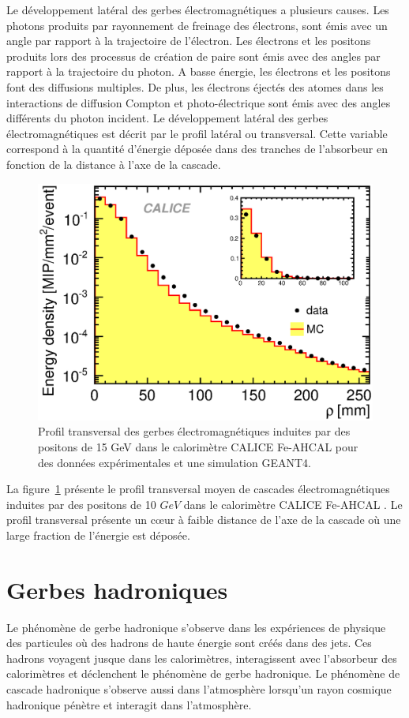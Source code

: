 Le développement latéral des gerbes électromagnétiques a plusieurs causes. Les photons produits par rayonnement de freinage des électrons, sont émis avec un angle par rapport à la trajectoire de l'électron. Les électrons et les positons produits lors des processus de création de paire sont émis avec des angles par rapport à la trajectoire du photon. A basse énergie, les électrons et les positons font des diffusions multiples. De plus, les électrons éjectés des atomes dans les interactions de diffusion Compton et photo-électrique sont émis avec des angles différents du photon incident. Le développement latéral des gerbes électromagnétiques est décrit par le profil latéral ou transversal. Cette variable correspond à la quantité d'énergie déposée dans des tranches de l'absorbeur en fonction de la distance à l'axe de la cascade. 

\begin{figure}[!h]
  \begin{center}
    \includegraphics[width=.5\textwidth]{ShowerTh/figs/transverseProfile_15gev_1cm.eps}
    \caption{Profil transversal des gerbes électromagnétiques induites par des positons de 15 GeV dans le calorimètre CALICE Fe-AHCAL pour des données expérimentales et une simulation GEANT4.}
    \label{fig:tProfil_e-}
  \end{center}
\end{figure}
La figure~\ref{fig:tProfil_e-} présente le profil transversal moyen de cascades électromagnétiques induites par des positons de 10 $GeV$ dans le calorimètre CALICE Fe-AHCAL \cite{1748-0221-6-04-P04003}. Le profil transversal présente un cœur à faible distance de l'axe de la cascade où une large fraction de l'énergie est déposée. 

\section{Gerbes hadroniques}
\label{sec.hadron_shower}
Le phénomène de gerbe hadronique s'observe dans les expériences de physique des particules où des hadrons de haute énergie sont créés dans des jets. Ces hadrons voyagent jusque dans les calorimètres, interagissent avec l'absorbeur des calorimètres et déclenchent le phénomène de gerbe hadronique. Le phénomène de cascade hadronique s'observe aussi dans l’atmosphère lorsqu'un rayon cosmique hadronique pénètre et interagit dans l'atmosphère. %
